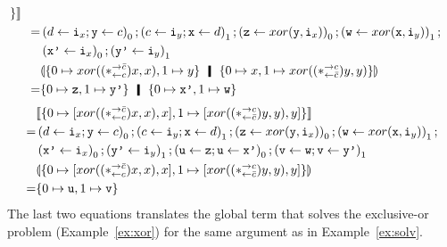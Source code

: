 \begin{example}
\begin{align*}
{  \}}
   \rrbracket\phantom{\hmid}\\
   =& \left(d\leftarrow \p i_x; \p y\leftarrow c\right)_0;
 \left(c\leftarrow \p i_y; \p x\leftarrow d\right)_1;
 \left(\p z\leftarrow xor(\p y,\p i_x)\right)_0;
 \left(\p w\leftarrow xor(\p x,\p i_y)\right)_1; \\
   & \left(\p{x'}\leftarrow \p i_x\right)_0;
     \left(\p{y'}\leftarrow \p i_y\right)_1 \\
&\llparenthesis
 {\{
  0\mapsto {xor((\comodL)x,x)}, 1\mapsto {y}
  \}}
  \hmid
  {\{
  0\mapsto {x},
  1\mapsto {xor((\comodR)y, y)}
  \}}
  \rrparenthesis\phantom{\hmid}\\
   =&
   \{0\mapsto \p z, 1\mapsto \p{y'}\} \hmid \{0\mapsto\p{x'}, 1\mapsto
   \p w\}
  \end{align*}
  \begin{align*}
   &\llbracket{
   \{
   0\mapsto [{{xor((\ast^{\rightarrow {\bar{c}}}_{\leftarrow{c}})x,x)},x}],
   1\mapsto [{{xor((\ast^{\rightarrow {c}}_{\leftarrow{\bar{c}}})y,y)},y}]
   \}}\rrbracket
   \\
   =&\left(d\leftarrow \texttt{i}_x; \texttt{y}\leftarrow c\right)_0;
   \left(c\leftarrow \texttt{i}_y; \texttt{x}\leftarrow d\right)_1;
   \left(\texttt{z}\leftarrow xor(\texttt{y},\texttt{i}_x)\right)_0;
   \left(\texttt{w}\leftarrow xor(\texttt{x},\texttt{i}_y)\right)_1; \\
   & \left(\texttt{x'}\leftarrow \texttt{i}_x\right)_0;
     \left(\texttt{y'}\leftarrow \texttt{i}_y\right)_1;
   \left(\texttt{u} \leftarrow \texttt{z}; \texttt{u} \leftarrow \texttt{x'}\right)_0 ;
   \left(\texttt{v}\leftarrow \texttt{w}; \texttt{v} \leftarrow \texttt{y'}\right)_1
   \\
   &\llparenthesis{
   \{
   0\mapsto [{{xor((\ast^{\rightarrow {\bar{c}}}_{\leftarrow{c}})x,x)},x}],
   1\mapsto [{{xor((\ast^{\rightarrow {c}}_{\leftarrow{\bar{c}}})y,y)},y}]
   \}}\rrparenthesis
   \\
   =&\{0\mapsto\texttt{u},1\mapsto \texttt{v}\}
  \end{align*}
  The last two equations translates the global term that solves the
  exclusive-or problem (Example~\ref{ex:xor}) for the same argument as
  in Example~\ref{ex:solv}.
 \end{example}

